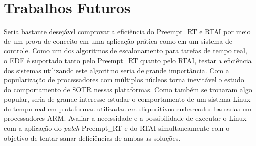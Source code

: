 \section{Trabalhos Futuros}
Seria bastante desejável comprovar a eficiência do Preempt\_RT e RTAI por meio de um prova de conceito em uma aplicação prática como em um sistema de controle.
Como um dos algoritmos de escalonamento para tarefas de tempo real, o EDF é suportado tanto  pelo Preempt\_RT quanto pelo RTAI, testar a eficiência dos sistemas utilizando este algoritmo seria de grande importância.
Com a popularização de processadores com múltiplos núcleos torna inevitável o estudo do comportamento de SOTR nessas plataformas. Como também se tronaram algo popular, seria de grande interesse estudar o comportamento de um sistema Linux de tempo real em plataformas utilizadas em dispositivos embarcados baseadas em processadores ARM.
Avaliar a necessidade e a possibilidade de executar o Linux com a aplicação do \textit{patch} Preempt\_RT e do RTAI simultaneamente com o objetivo de tentar sanar deficiências de ambas as soluções.
